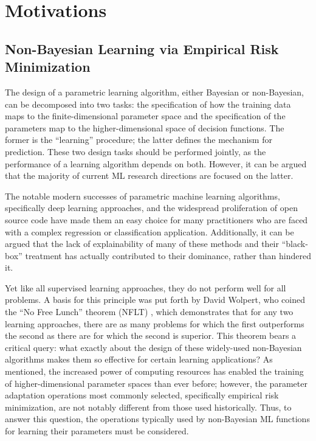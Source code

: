 \documentclass[12pt]{report}
\begin{document}
\chapter{Motivations} \label{sec:motivation}

\section{Non-Bayesian Learning via Empirical Risk Minimization}

The design of a parametric learning algorithm, either Bayesian or non-Bayesian, can be decomposed into two tasks: the specification of how the training data maps to the finite-dimensional parameter space and the specification of the parameters map to the higher-dimensional space of decision functions. The former is the ``learning'' procedure; the latter defines the mechanism for prediction. These two design tasks should be performed jointly, as the performance of a learning algorithm depends on both. However, it can be argued that the majority of current ML research directions are focused on the latter.


The notable modern successes of parametric machine learning algorithms, specifically deep learning approaches, and the widespread proliferation of open source code \cite{tensorflow} have made them an easy choice for many practitioners who are faced with a complex regression or classification application. Additionally, it can be argued that the lack of explainability of many of these methods and their ``black-box'' treatment has actually contributed to their dominance, rather than hindered it. 

Yet like all supervised learning approaches, they do not perform well for all problems. A basis for this principle was put forth by David Wolpert, who coined the ``No Free Lunch'' theorem (NFLT) \cite{wolpert}, which demonstrates that for any two learning approaches, there are as many problems for which the first outperforms the second as there are for which the second is superior. This theorem bears a critical query: what exactly about the design of these widely-used non-Bayesian algorithms makes them so effective for certain learning applications? As mentioned, the increased power of computing resources has enabled the training of higher-dimensional parameter spaces than ever before; however, the parameter adaptation operations most commonly selected, specifically empirical risk minimization, are not notably different from those used historically. Thus, to answer this question, the operations typically used by non-Bayesian ML functions for learning their parameters must be considered.
\end{document}
